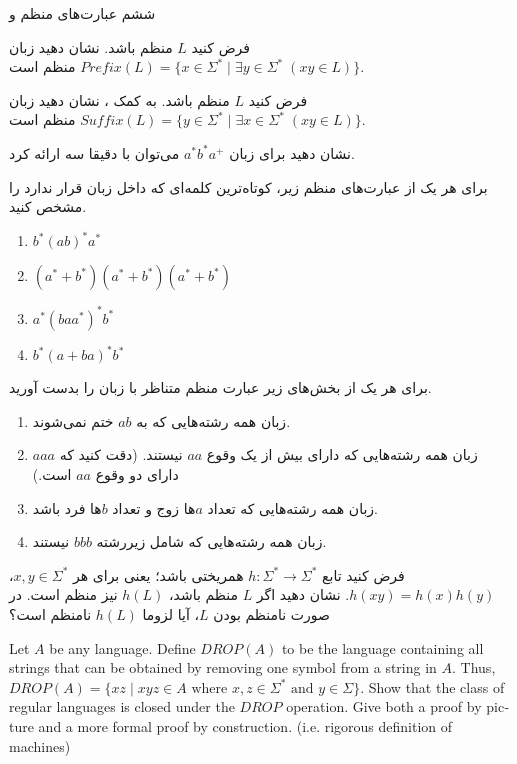 
	
	\MakeTitle
	{ششم}
	{عبارت‌های منظم و }
	\begin{enumerate}
		\item 
		فرض کنید $L$ منظم باشد. نشان دهید زبان
		$Prefix(L) = \{x \in \Sigma^* \;|\; \exists y \in \Sigma^* \; (xy \in L)  \}$
		منظم است. 
		\item 
		فرض کنید $L$ منظم باشد. به کمک ، نشان دهید زبان 
		$Suffix(L) = \{y \in \Sigma^* \;|\; \exists x \in \Sigma^* \; (xy \in L)  \}$
		منظم است. 
		\item 
		نشان دهید برای زبان
		$a^*b^*a^+$
		می‌توان  با دقیقا سه  ارائه کرد.
		\item 
		برای هر یک از عبارت‌های منظم زیر، کوتاه‌ترین کلمه‌ای که داخل زبان قرار ندارد را مشخص کنید.
		\begin{enumerate}
			\item $b^*(ab)^*a^*$
			\item $(a^* + b^*)(a^* + b^*)(a^* + b^*)$
			\item $a^*(baa^*)^*b^*$
			\item $b^*(a+ba)^*b^*$
		\end{enumerate}
	
		\item 
		برای هر یک از بخش‌های زیر عبارت منظم متناظر با زبان را بدست آورید.
		\begin{enumerate}
			\item 
			زبان همه رشته‌هایی که به $ ab $ ختم نمی‌شوند.
			\item 
			زبان همه رشته‌هایی که دارای بیش از یک وقوع $ aa $ نیستند. (دقت کنید که $ aaa $ دارای دو وقوع $ aa $ است.)
			\item 
			زبان همه رشته‌هایی که تعداد $ a $ها زوج و تعداد $ b $ها فرد باشد.
			\item 
			زبان همه رشته‌هایی که شامل زیررشته $ bbb $ نیستند.
		\end{enumerate}
		\item
		فرض کنید تابع 
		$h : \Sigma^* \longrightarrow \Sigma^*$
		همریختی باشد؛ یعنی برای هر $x, y \in \Sigma^*$، $h(xy) = h(x)h(y)$. نشان دهید اگر $L$ منظم باشد، 
		$h(L)$ 
		نیز منظم است. در صورت نامنظم بودن $L$، آیا لزوما 
		$h(L)$
		نامنظم است؟
		\begin{latin}
			\item Let $A$ be any language. Define $DROP(A)$ to be the language containing all strings that can be obtained by removing one symbol from a string in $A$. Thus, $DROP(A) = \{xz \;|\; \text{$xyz \in A$ where $x,z \in \Sigma^*$ and $y \in \Sigma$}\}$. Show that the class of regular languages is closed under the $DROP$ operation. Give both a proof by picture and a more formal proof by construction. (i.e. rigorous definition of machines)
			
		\end{latin}
		
	\end{enumerate}	
